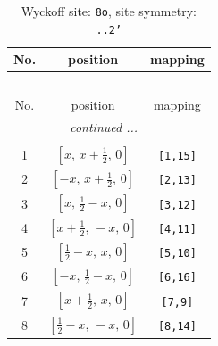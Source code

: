 \documentclass[fleqn,8pt]{jsarticle}
\begin{document}
\begin{longtable}{ccc}
\caption{Wyckoff site: {\tt 8o}, site symmetry: {\tt ..2'}}
 \\
 \hline \hline
No. & position & mapping \\ \hline \endfirsthead

\multicolumn{2}{l}{\tablename\ \thetable{}} \\
 \hline \hline
No. & position & mapping \\ \hline \endhead

 \hline \hline
\multicolumn{2}{r}{\footnotesize\it continued ...} \\ \endfoot

 \hline \hline
\multicolumn{2}{r}{} \\ \endlastfoot

1 & $\left[ x,\, x + \frac{1}{2},\, 0 \right]$ & {\tt [1,15]} \\ \hline
2 & $\left[ - x,\, x + \frac{1}{2},\, 0 \right]$ & {\tt [2,13]} \\ \hline
3 & $\left[ x,\, \frac{1}{2} - x,\, 0 \right]$ & {\tt [3,12]} \\ \hline
4 & $\left[ x + \frac{1}{2},\, - x,\, 0 \right]$ & {\tt [4,11]} \\ \hline
5 & $\left[ \frac{1}{2} - x,\, x,\, 0 \right]$ & {\tt [5,10]} \\ \hline
6 & $\left[ - x,\, \frac{1}{2} - x,\, 0 \right]$ & {\tt [6,16]} \\ \hline
7 & $\left[ x + \frac{1}{2},\, x,\, 0 \right]$ & {\tt [7,9]} \\ \hline
8 & $\left[ \frac{1}{2} - x,\, - x,\, 0 \right]$ & {\tt [8,14]} \\
\end{longtable}
\renewcommand{\arraystretch}{1.2}
\end{document}
